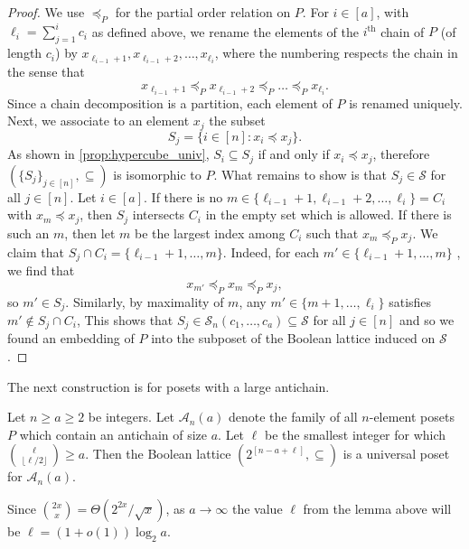 \documentclass[11pt]{article}
\newcommand{\1}{\mathbbm{1}}
\def\cleq{\preccurlyeq}
\begin{document}
\begin{proof}
We use $\cleq_P$ for the partial order relation on $P$. For $i\in [a]$, with $\ell_i=\sum_{j=1}^ic_i$ as defined above, we rename the elements of the $i^\text{th}$ chain of $P$ (of length $c_i$) by $x_{\ell_{i-1}+1},x_{\ell_{i-1}+2},\dots,x_{\ell_{i}}$, where the numbering respects the chain in the sense that
\[
x_{\ell_{i-1}+1}\cleq_Px_{\ell_{i-1}+2}\cleq_P\dots \cleq_P x_{\ell_{i}}.
\]
Since a chain decomposition is a partition, each element of $P$ is renamed uniquely. 
Next, we associate to an element $x_j$ the subset
\[
S_j=\{i\in [n]:x_i \cleq x_j\}.
\]
As shown in \cref{prop:hypercube_univ}, $S_i\subseteq S_j$ if and only if $x_i\cleq x_j$, therefore $(\{S_j\}_{j \in [n]},\subseteq)$ is isomorphic to $P$. What remains to show is that $S_j\in \mathcal{S}$ for all $j\in [n]$. 
Let $i\in [a]$. If there is no $m\in \{\ell_{i-1}+1,\ell_{i-1}+2,\dots,\ell_i\}=C_i$ with $x_m\cleq x_j$, then $S_j$ intersects $C_i$ in the empty set which is allowed. If there is such an $m$, then let $m$ be the largest index among $C_i$ such that $x_m \cleq_P x_j$. We claim that $S_j\cap C_i=\{\ell_{i-1}+1,\dots,m\}$. Indeed, for each $m'\in \{\ell_{i-1}+1,\dots,m\}$ , we find that
\[
x_{m'}\cleq_P x_m\cleq_P x_j,
\]
so $m'\in S_j$. Similarly, by maximality of $m$, any $m' \in \{m+1, \ldots, \ell_{i}\}$ satisfies $m' \notin S_j \cap C_i$, This shows that $S_j\in \mathcal{S}_n(c_1,\dots,c_a)\subseteq \mathcal{S}$ for all $j\in [n]$ and so we found an embedding of $P$ into the subposet of the Boolean lattice induced on $\mathcal{S}$.
\end{proof}
The next construction is for posets with a large antichain.
\begin{lemma}
\label{lem:hypercube_antichain}
    Let $n\geq a\geq 2$ be integers. Let $\mathcal{A}_n(a)$ denote the family of all $n$-element posets $P$ which contain an antichain of size $a$. Let $\ell$ be the smallest integer for which $\binom{\ell}{\lfloor\ell/2\rfloor}\geq a$. 
    Then the Boolean lattice $(2^{[n-a+\ell]},\subseteq)$ is a universal poset for $\mathcal{A}_n(a)$. 
\end{lemma}
Since $\binom{2x}{x}=\Theta(2^{2x}/\sqrt{x})$, as $a\to \infty$ the value $\ell$ from the lemma above will be $\ell=(1+o(1))\log_2a$.
\end{document}
